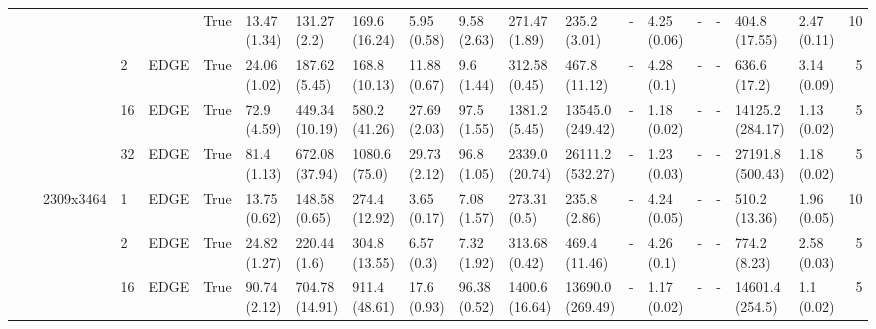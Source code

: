 \begin{tabular}{lllllllllllllllllllr}
                  &      &           &    &      & True &              13.47 (1.34) &                 131.27 (2.2) &                 169.6 (16.24) &                  5.95 (0.58) &           9.58 (2.63) &            271.47 (1.89) &              235.2 (3.01) &              - &              4.25 (0.06) &                - &             - &      404.8 (17.55) &          2.47 (0.11) &     10 \\
                  &      &           & 2  & EDGE & True &              24.06 (1.02) &                187.62 (5.45) &                 168.8 (10.13) &                 11.88 (0.67) &            9.6 (1.44) &            312.58 (0.45) &             467.8 (11.12) &              - &               4.28 (0.1) &                - &             - &       636.6 (17.2) &          3.14 (0.09) &      5 \\
                  &      &           & 16 & EDGE & True &               72.9 (4.59) &               449.34 (10.19) &                 580.2 (41.26) &                 27.69 (2.03) &           97.5 (1.55) &            1381.2 (5.45) &          13545.0 (249.42) &              - &              1.18 (0.02) &                - &             - &   14125.2 (284.17) &          1.13 (0.02) &      5 \\
                  &      &           & 32 & EDGE & True &               81.4 (1.13) &               672.08 (37.94) &                 1080.6 (75.0) &                 29.73 (2.12) &           96.8 (1.05) &           2339.0 (20.74) &          26111.2 (532.27) &              - &              1.23 (0.03) &                - &             - &   27191.8 (500.43) &          1.18 (0.02) &      5 \\
                  &      & 2309x3464 & 1  & EDGE & True &              13.75 (0.62) &                148.58 (0.65) &                 274.4 (12.92) &                  3.65 (0.17) &           7.08 (1.57) &             273.31 (0.5) &              235.8 (2.86) &              - &              4.24 (0.05) &                - &             - &      510.2 (13.36) &          1.96 (0.05) &     10 \\
                  &      &           & 2  & EDGE & True &              24.82 (1.27) &                 220.44 (1.6) &                 304.8 (13.55) &                   6.57 (0.3) &           7.32 (1.92) &            313.68 (0.42) &             469.4 (11.46) &              - &               4.26 (0.1) &                - &             - &       774.2 (8.23) &          2.58 (0.03) &      5 \\
                  &      &           & 16 & EDGE & True &              90.74 (2.12) &               704.78 (14.91) &                 911.4 (48.61) &                  17.6 (0.93) &          96.38 (0.52) &           1400.6 (16.64) &          13690.0 (269.49) &              - &              1.17 (0.02) &                - &             - &    14601.4 (254.5) &           1.1 (0.02) &      5 \\

\end{tabular}
